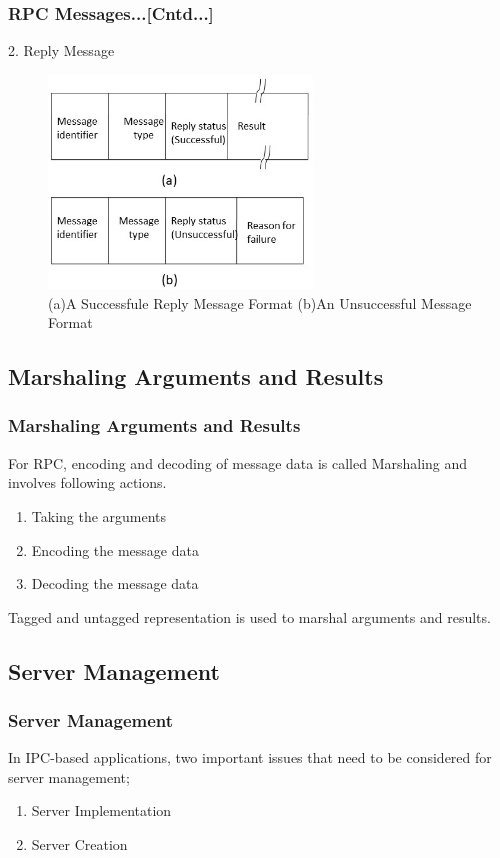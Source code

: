 \documentclass{beamer}
\begin{document}
\begin{frame}
	\frametitle{RPC Messages...[Cntd...]}
	\vspace{0.5cm}
	2. Reply Message\\
	\begin{figure}
		\centering
		\includegraphics[width=7cm]{fig44.jpg}
		\caption{(a)A Successfule Reply Message Format (b)An Unsuccessful Message Format}
	\end{figure}
\end{frame}


\subsection{Marshaling Arguments and Results}
\begin{frame}
	\frametitle{Marshaling Arguments and Results}
	For RPC, encoding and decoding of message data is called Marshaling and involves following actions.
	\begin{enumerate}
		\item Taking the arguments
		\item Encoding the message data
		\item Decoding the message data
	\end{enumerate}
	\vspace{0.5cm}
	Tagged and untagged representation is used to marshal arguments and results.
	\vspace{4cm}
\end{frame}

\subsection{Server Management}
\begin{frame}
	\frametitle{Server Management}
	In IPC-based  applications, two important issues that need to be considered for server management; 
	\vspace{0.5cm}
	\begin{enumerate}
		\item Server Implementation
		\item Server Creation
	\end{enumerate}
	\vspace{5cm}
\end{frame}
\end{document}
